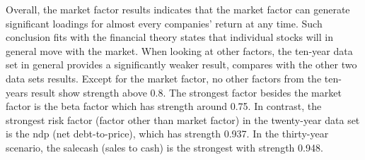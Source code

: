 Overall, the market factor results indicates that the market factor can generate significant loadings for almost every companies' return at any time.
Such conclusion fits with the financial theory states that individual stocks will in general move with the market.
When looking at other factors,  the ten-year data set in general provides a significantly weaker result, compares with the other two data sets results.
Except for the market factor, no other factors from the ten-years result show strength above 0.8.
The strongest factor besides the market factor is the beta factor which has strength around 0.75.
In contrast, the strongest risk factor (factor other than market factor) in the twenty-year data set is the ndp (net debt-to-price), which has strength 0.937.
In the thirty-year scenario, the salecash (sales to cash) is the strongest with strength 0.948.

